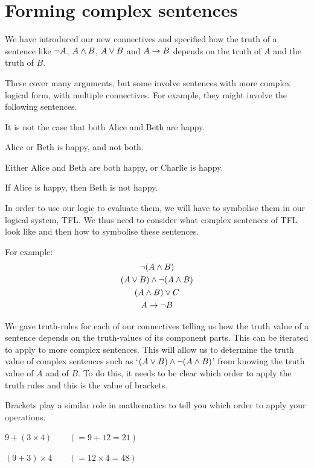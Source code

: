 \section{Forming complex sentences}
We have introduced our new connectives and specified how the truth of a sentence like $\neg A$, $A\mathbin{\wedge} B$, $A\vee B$ and $A\rightarrow B$ depends on the truth of $A$ and the truth of $B$. 

These cover many arguments, but some involve sentences with more complex logical form, with multiple connectives. For example, they might involve the following sentences. 
\begin{samplesent}
	\item It is not the case that both Alice and Beth are happy.
	\item \label{sent:exclAB}Alice or Beth is happy, and not both.
	\item Either Alice and Beth are both happy, or Charlie is happy. 
	\item If Alice is happy, then Beth is not happy.
\end{samplesent}

In order to use our logic to evaluate them, we will have to symbolise them in our logical system, TFL. 
We thus need to consider what complex sentences of TFL look like and then how to symbolise these sentences. 

For example:
\begin{gather*}
	\neg(A\mathbin{\wedge} B)\\
	(A\vee B)\mathbin{\wedge}\neg(A\mathbin{\wedge} B)\\
	(A\mathbin{\wedge} B)\vee C\\
	 A\rightarrow \neg  B
\end{gather*}



We gave truth-rules for each of our connectives telling us how the truth value of a sentence depends on the truth-values of its component parts. This can be iterated to apply to more complex sentences. This will allow us to determine the truth value of complex sentences such as `$(A\vee B)\mathbin{\wedge}\neg(A\mathbin{\wedge} B)$' from knowing the truth value of $A$ and of $B$. To do this, it needs to be clear which order to apply the truth rules and this is the value of brackets. 

Brackets play a similar role in mathematics to tell you which order to apply your operations. 
\begin{samplesent}
	\item\label{sent:mathamb1} $9 + (3 \times 4) \qquad(=9+12=21)$
	\item\label{sent:mathamb2} $(9+3) \times 4 \qquad(=12\times 4=48)$
\end{samplesent}

